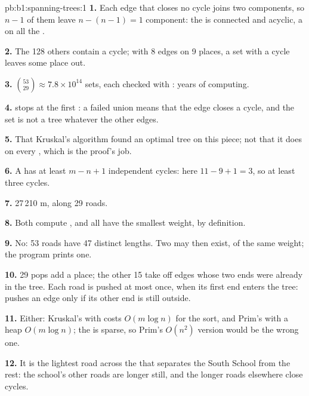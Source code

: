 \begin{solution}{pb:b1:spanning-trees:1}
\textbf{1.} Each edge that closes no cycle joins two components, so $n - 1$ of them leave $n - (n - 1) = 1$ component:
the  is connected and acyclic, a  on all the .

\textbf{2.} The 128 others contain a cycle; with 8 edges on 9 places, a set with a cycle leaves some place out.

\textbf{3.} $\binom{53}{29} \approx 7.8 \times 10^{14}$ sets, each checked with : years of computing.

\textbf{4.}  stops at the first : a failed union means that the edge closes a cycle, and the set is
not a tree whatever the other edges.

\textbf{5.} That Kruskal's algorithm found an optimal tree on this piece; not that it does on every , which is the
proof's job.

\textbf{6.} A  has at least $m - n + 1$ independent cycles: here $11 - 9 + 1 = 3$, so at least three
cycles.

\textbf{7.} 27\,210 m, along 29 roads.

\textbf{8.} Both compute , and all  have the smallest weight, by
definition.

\textbf{9.} No: 53 roads have 47 distinct lengths. Two  may then exist, of the same weight; the
program prints one.

\textbf{10.} 29 pops add a place; the other 15 take off edges whose two ends were already in the tree. Each road is
pushed at most once, when its first end enters the tree:  pushes an edge only if its other end is still
outside.

\textbf{11.} Either: Kruskal's with  costs $O(m \log n)$ for the sort, and Prim's with a heap $O(m \log n)$;
the  is sparse, so Prim's $O(n^2)$  version would be the wrong one.

\textbf{12.} It is the lightest road across the  that separates the South School from the rest: the school's other
roads are longer still, and the longer roads elsewhere close cycles.


\end{solution}
